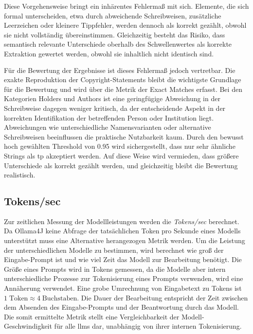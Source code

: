 Diese Vorgehensweise bringt ein inhärentes Fehlermaß mit sich.
Elemente, die sich formal unterscheiden, etwa durch abweichende Schreibweisen, zusätzliche Leerzeichen oder kleinere Tippfehler, werden dennoch als korrekt gezählt, obwohl sie nicht vollständig übereinstimmen.
Gleichzeitig besteht das Risiko, dass semantisch relevante Unterschiede oberhalb des Schwellenwertes als korrekte Extraktion gewertet werden, obwohl sie inhaltlich nicht identisch sind.

Für die Bewertung der Ergebnisse ist dieses Fehlermaß jedoch vertretbar.
Die exakte Reproduktion der Copyright-Statements bleibt die wichtigste Grundlage für die Bewertung und wird über die Metrik der Exact Matches erfasst.
Bei den Kategorien Holders und Authors ist eine geringfügige Abweichung in der Schreibweise dagegen weniger kritisch, da der entscheidende Aspekt in der korrekten Identifikation der betreffenden Person oder Institution liegt.
Abweichungen wie unterschiedliche Namensvarianten oder alternative Schreibweisen beeinflussen die praktische Nutzbarkeit kaum.
Durch den bewusst hoch gewählten Threshold von \num{0,95} wird sichergestellt, dass nur sehr ähnliche Strings als \gls{tp} akzeptiert werden.
Auf diese Weise wird vermieden, dass größere Unterschiede als korrekt gezählt werden, und gleichzeitig bleibt die Bewertung realistisch.


\subsection{Tokens/sec}
Zur zeitlichen Messung der Modellleistungen werden die \textit{Tokens/sec} berechnet.
Da Ollama4J keine Abfrage der tatsächlichen Token pro Sekunde eines Modells unterstützt muss eine Alternative herangezogen Metrik werden.
Um die Leistung der unterschiedlichen Modelle zu bestimmen, wird berechnet wie groß der Eingabe-Prompt ist und wie viel Zeit das Modell zur Bearbeitung benötigt.
Die Größe eines Prompts wird in Tokens gemessen, da die Modelle aber intern unterschiedliche Prozesse zur Tokenisierung eines Prompts verwenden, wird eine Annäherung verwendet.
Eine grobe Umrechnung von Eingabetext zu Tokens ist $1\;\text{Token}\approx 4\;\text{Buchstaben}$\autocite{noauthor_what_nodate}.
Die Dauer der Bearbeitung entspricht der Zeit zwischen dem Absenden des Eingabe-Prompts und der Beantwortung durch das Modell.
Die somit ermittelte Metrik stellt eine Vergleichbarkeit der Modell-Geschwindigkeit für alle \glspl{llm} dar, unabhängig von ihrer internen Tokenisierung.

